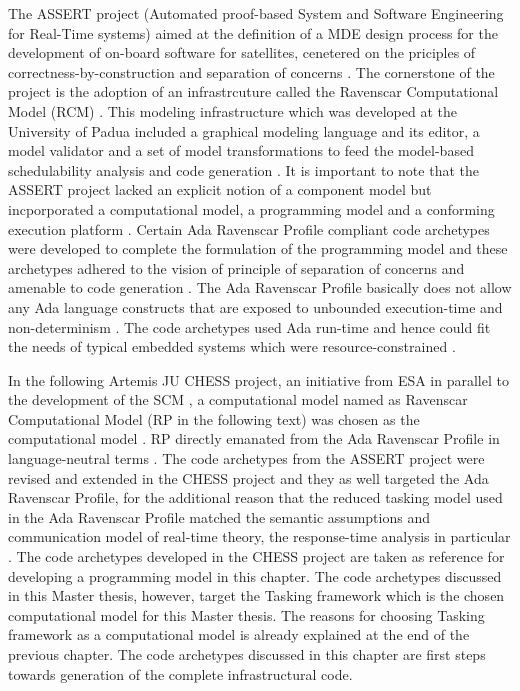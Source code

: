 The ASSERT project (Automated proof-based System and Software Engineering for Real-Time systems) aimed at the definition of a MDE design process for the development of on-board software for satellites, cenetered on the priciples of correctness-by-construction and separation of concerns \cite{PhdThesis}. The cornerstone of the project is the adoption of an infrastrcuture called the Ravenscar Computational Model (RCM) \cite{PhdThesis}. This modeling infrastructure which was developed at the University of Padua \cite{ScheduAnaly} included a graphical modeling language and its editor, a model validator and a set of model transformations to feed the model-based schedulability analysis and code generation \cite{ScheduAnaly}. It is important to note that the ASSERT project lacked an explicit notion of a component model but incporporated a computational model, a programming model and a conforming execution platform \cite{PhdThesis}. Certain Ada Ravenscar Profile compliant code archetypes were developed to complete the formulation of the programming model and these archetypes adhered to the vision of principle of separation of concerns and amenable to code generation \cite{CharEvoRAVCodeAr}. The Ada Ravenscar Profile basically does not allow any Ada language constructs that are exposed to unbounded execution-time and non-determinism \cite{RAVCodeAr}. The code archetypes used Ada run-time and hence could fit the needs of typical embedded systems which were resource-constrained \cite{RAVCodeAr}.   

In the following Artemis JU CHESS project, an initiative from ESA in parallel to the development of the SCM \cite{CompBasedProcess}\cite{PhdThesis}, a computational model named as Ravenscar Computational Model (RP in the following text) was chosen as the computational model \cite{ScheduAnaly}. RP directly emanated from the Ada Ravenscar Profile in language-neutral terms \cite{CharEvoRAVCodeAr}\cite{EvoRAVCodeAr}. The code archetypes from the ASSERT project were revised and extended in the CHESS project and they as well targeted the Ada Ravenscar Profile, for the additional reason that the reduced tasking model used in the Ada Ravenscar Profile matched the semantic assumptions and communication model of real-time theory, the response-time analysis in particular \cite{CharEvoRAVCodeAr}. The code archetypes developed in the CHESS project \cite{EvoRAVCodeAr} are taken as reference for developing a programming model in this chapter. The code archetypes discussed in this Master thesis, however, target the Tasking framework which is the chosen computational model for this Master thesis. The reasons for choosing Tasking framework as a computational model is already explained at the end of the previous chapter. The code archetypes discussed in this chapter are first steps towards generation of the complete infrastructural code. 

